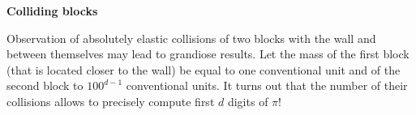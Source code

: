 \documentclass[12pt]{article}
\begin{document}
\begin{titlepage}
\begin{center}
	\LARGE\textbf{Colliding blocks}
\end{center}
\large
Observation of absolutely elastic collisions of two blocks with the wall and between themselves may lead to grandiose results. Let the mass of the first block (that is located closer to the wall) be equal to one conventional unit and of the second block to ${100}^{d-1}$ conventional units. It turns out that the number of their collisions allows to precisely compute first $d$ digits of $\pi$!
\end{titlepage}
\end{document}
